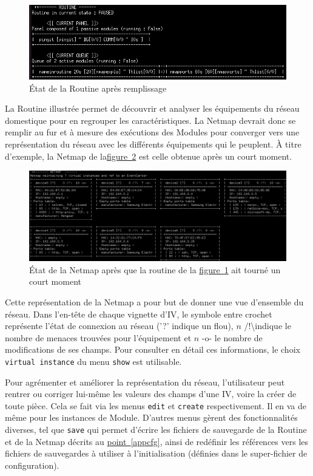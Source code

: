 \documentclass[]{article}
\newcommand{\wordlink}[2]{\hyperref[#1]{#2~\ref{#1}}}
\begin{document}
\begin{figure}[!ht]
\centering
     \includegraphics[width=0.7\linewidth]{vueroutine}
     \caption{État de la Routine après remplissage}
     \label{vueroutine}
\end{figure}

La Routine illustrée permet de découvrir et analyser les équipements du réseau domestique pour en regrouper les caractéristiques. La Netmap devrait donc se remplir au fur et à mesure des exécutions des Modules pour converger vers une représentation du réseau avec les différents équipements qui le peuplent. À titre d'exemple, la Netmap de la\wordlink{vuenetmap}{figure} est celle obtenue après un court moment.


\begin{figure}[!ht]
\centering
     \includegraphics[width=\linewidth]{netmap}
     \caption{État de la Netmap après que la routine de la \wordlink{vueroutine}{figure} ait tourné un court moment}
     \label{vuenetmap}
\end{figure}

\par Cette représentation de la Netmap a pour but de donner une vue d'ensemble du réseau. Dans l'en-tête de chaque vignette d'IV, le symbole entre crochet représente l'état de connexion au réseau ('?' indique un flou), $n$ /!\textbackslash  indique le nombre de menaces trouvées pour l'équipement et $n$ -o- le nombre de modifications de ses champs. Pour consulter en détail ces informations, le choix \texttt{virtual instance} du menu \texttt{show} est utilisable.\\

\par Pour agrémenter et améliorer la représentation du réseau, l'utilisateur peut rentrer ou corriger lui-même les valeurs des champs d'une IV, voire la créer de toute pièce. Cela se fait via les menus \texttt{edit} et \texttt{create} respectivement. Il en va de même pour les instances de Module. D'autres menus gèrent des fonctionnalités diverses, tel que \texttt{save} qui permet d'écrire les fichiers de sauvegarde de la Routine et de la Netmap décrits au \wordlink{appcfg}{point}, ainsi de redéfinir les références vers les fichiers de sauvegardes à utiliser à l'initialisation (définies dans le super-fichier de configuration). 
\end{document}

